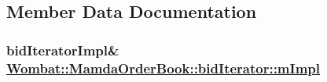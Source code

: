 \subsection{Member Data Documentation}
\hypertarget{classWombat_1_1MamdaOrderBook_1_1bidIterator_93880f0527fcd1904174ae11c70b9d4d}{
\subsubsection[mImpl]{\setlength{\rightskip}{0pt plus 5cm}bid\-Iterator\-Impl\& \hyperlink{classWombat_1_1MamdaOrderBook_1_1bidIterator_93880f0527fcd1904174ae11c70b9d4d}{Wombat::Mamda\-Order\-Book::bid\-Iterator::m\-Impl}}}
\label{classWombat_1_1MamdaOrderBook_1_1bidIterator_93880f0527fcd1904174ae11c70b9d4d}


